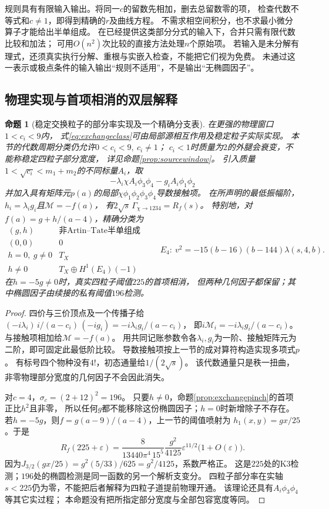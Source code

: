 \documentclass[11pt,a4paper]{ctexart}
\theoremstyle{cnplain}\newtheorem{theorem}{定理}[section]
\newtheorem{proposition}[theorem]{命题}
\theoremstyle{definition}\newtheorem{definition}[theorem]{定义}
\theoremstyle{remark}\newtheorem{remark}[theorem]{注}
\begin{document}
规则具有有限输入输出。将同一$c$的留数先相加，删去总留数零的项，
检查代数不等式和$c\ne1$，即得到精确的$r$及曲线方程。
不需求相空间积分，也不求最小微分算子才能给出半单组成。
在已经提供这类部分分式的输入下，合并只需有限代数比较和加法；
可用$O(n^2)$次比较的直接方法处理$n$个原始项。
若输入是未分解有理式，还须真实执行分解、重根与实嵌入检查，不能把它们视为免费。
未通过这一表示或极点条件的输入输出“规则不适用”，不是输出“无椭圆因子”。

\subsection{物理实现与首项相消的双层解释}
\begin{proposition}[稳定交换粒子的部分率实现及一个精确分支表]\label{prop:exchangephysical}
在更强的物理窗口$1<c_i<9$内，
式\eqref{eq:exchangeclass}可由局部源相互作用及稳定粒子实际实现。
本节的代数周期分类仍允许$0<c_i<9,\ c_i\ne1$；
$c_i<1$时质量为$2$的外腿会衰变，不能称稳定四粒子部分宽度，
详见命题\ref{prop:sourcewindow}。
引入质量$1<\sqrt{c_i}<m_1+m_2$的不同标量$A_i$，取
\[
 -\lambda_i\chi A_i\phi_3\phi_4-g_i A_i\phi_1\phi_2
\]
并加入具有矩阵元$p(a)$的局部$\chi\phi_1\phi_2\phi_3\phi_4$导数接触项。
在所声明的最低振幅阶，$h_i=\lambda_i g_i$且$\mathcal M=-f(a)$，
有$2\sqrt s\,\Gamma_{\chi\to1234}=R_f(s)$。
特别地，对$f(a)=g+h/(a-4)$，精确分类为
\[
 \begin{array}{c|c}
 (g,h) & \text{非Artin--Tate半单组成}\\ \hline
 (0,0)&0\\
 h=0,\ g\ne0&T_X\\
 h\ne0&T_X\oplus H^1(E_4)(-1)
 \end{array}
 \qquad
 E_4:\ v^2=-15(b-16)(b-144)\lambda(s,4,b).
\]
在$h=-5g\ne0$时，真实四粒子阈值$225$的首项相消，
但两种几何因子都保留；其中椭圆因子由续接的私有阈值$196$检测。
\end{proposition}
\begin{proof}
四价与三价顶点及一个传播子给
$(-i\lambda_i)\,i/(a-c_i)\,(-ig_i)=-i\lambda_i g_i/(a-c_i)$，
即$i\mathcal M_i=-i\lambda_i g_i/(a-c_i)$。
与接触项相加给$\mathcal M=-f(a)$。
用共同记账参数令各$\lambda_i,g_i$为一阶、接触矩阵元为二阶，即可固定此最低阶比较。
导数接触项按上一节的成对算符构造实现多项式$p$。
有标号四个物种没有$4!$，初态通量给$1/(2\sqrt s)$。
该代数通量只是秩一扭曲，非零物理部分宽度的几何因子不会因此消失。

对$c=4$，$\sigma_c=(2+12)^2=196$。
只要$h\ne0$，命题\ref{prop:exchangepinch}的首项正比$h^2$且非零，
所以任何$g$都不能移除这份椭圆因子；$h=0$时新增除子不存在。
若$h=-5g$，则$f=g(a-9)/(a-4)$，上一节的阈值喷射为
$h_1(x,y)=gx/25$。于是
\[
 R_f(225+\varepsilon)
 =\frac{8}{13440\pi^4\,15^5}\frac{g^2}{4125}
      \varepsilon^{11/2}\bigl(1+O(\varepsilon)\bigr).
\]
因为$J_{3/2}(gx/25)=g^2(5/33)/625=g^2/4125$，系数严格正。
这是$225$处的K3检测；$196$处的椭圆检测是同一函数的另一个解析支变分。
四粒子部分率在实轴$s<225$仍为零，不能把后者解释为四粒子道提前物理开通。
该理论还具有$A_i\phi_3\phi_4$等其它实过程；
本命题没有把所指定部分宽度与全部包容宽度等同。
\end{proof}
\end{document}
